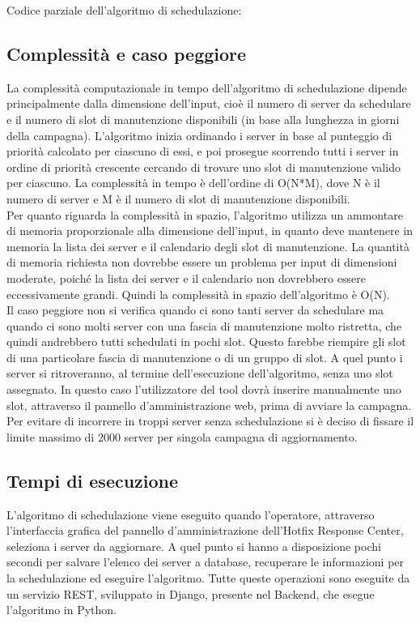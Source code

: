 Codice parziale dell'algoritmo di schedulazione:



\subsection{Complessità e caso peggiore}
La complessità computazionale in tempo dell'algoritmo di schedulazione dipende 
principalmente dalla dimensione dell'input, cioè il numero di server da 
schedulare e il numero di slot di manutenzione disponibili (in base alla 
lunghezza in giorni della campagna).
L'algoritmo inizia ordinando i server in base al punteggio di priorità 
calcolato per ciascuno di essi, e poi prosegue scorrendo tutti i server in 
ordine di priorità crescente cercando di trovare uno slot di manutenzione 
valido per ciascuno. La complessità in tempo è dell'ordine di O(N*M), 
dove N è il numero di server e M è il numero di slot di manutenzione 
disponibili.\\

Per quanto riguarda la complessità in spazio, l'algoritmo utilizza un 
ammontare di memoria proporzionale alla dimensione dell'input, in quanto deve 
mantenere in memoria la lista dei server e il calendario degli slot di 
manutenzione. La quantità di memoria richiesta non dovrebbe essere un 
problema per input di dimensioni moderate, poiché la lista dei server e 
il calendario non dovrebbero essere eccessivamente grandi. Quindi la 
complessità in spazio dell'algoritmo è O(N).\\

Il caso peggiore non si verifica quando ci sono tanti 
server da schedulare ma quando ci sono molti server con una fascia di 
manutenzione molto ristretta, che quindi andrebbero tutti schedulati in 
pochi slot. Questo farebbe riempire gli slot di una particolare fascia di 
manutenzione o di un gruppo di slot. A quel punto i server si ritroveranno, 
al termine dell’esecuzione dell’algoritmo, senza uno slot assegnato. 
In questo caso l’utilizzatore del tool dovrà inserire manualmente uno slot, 
attraverso il pannello d'amministrazione web, prima di avviare la campagna.\\

Per evitare di incorrere in troppi server senza schedulazione si è deciso di 
fissare il limite massimo di 2000 server per singola campagna di aggiornamento.


\subsection{Tempi di esecuzione}
L’algoritmo di schedulazione viene eseguito quando l'operatore, attraverso 
l’interfaccia grafica del pannello d'amministrazione dell’Hotfix Response Center, 
seleziona i server da aggiornare. 
A quel punto si hanno a disposizione pochi secondi per salvare 
l’elenco dei server a database, recuperare le informazioni per la schedulazione 
ed eseguire l’algoritmo.
Tutte queste operazioni sono eseguite da un servizio REST, sviluppato in Django, 
presente nel Backend, che esegue l'algoritmo in Python.

